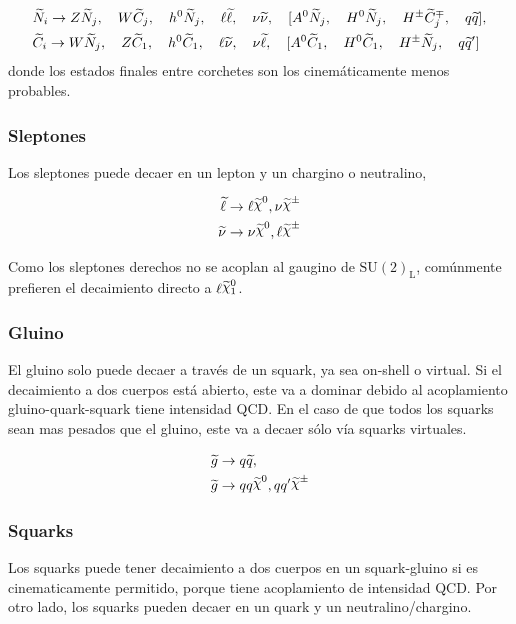 \begin{align*}
  &\widetilde{N}_i \rightarrow Z \widetilde{N}_j, \quad W \widetilde{C}_j, \quad h^0 \widetilde{N}_j, \quad
  \ell \widetilde{\ell}, \quad \nu \widetilde{\nu}, \quad [A^0 \widetilde{N}_j, \quad H^0
    \widetilde{N}_j, \quad H^{\pm} \widetilde{C}_j^{\mp}, \quad q \widetilde{q}],
  \\ &\widetilde{C}_i \rightarrow W \widetilde{N}_j, \quad Z \widetilde{C}_1, \quad h^0 \widetilde{C}_1,
  \quad \ell \widetilde{\nu}, \quad \nu \widetilde{\ell}, \quad [A^0 \widetilde{C}_1, \quad H^0
    \widetilde{C}_1, \quad H^{\pm} \widetilde{N}_j, \quad q \widetilde{q}']
\end{align*}
%
donde los estados finales entre corchetes son los cinemáticamente menos
probables.


\subsubsection{Sleptones}

Los sleptones puede decaer en un lepton y un chargino o neutralino,

\begin{align}
  \slepton &\to \ell \nino, \nu\chinopm \\ \snu &\to \nu\nino, \ell\chinopm
\end{align}

Como los sleptones derechos no se acoplan al gaugino de $\text{SU}(2)_\text{L}$,
comúnmente prefieren el decaimiento directo a $\ell\ninoone$.


\subsubsection{Gluino}

El gluino solo puede decaer a través de un squark, ya sea on-shell o virtual. Si
el decaimiento a dos cuerpos está abierto, este va a dominar debido al
acoplamiento gluino-quark-squark tiene intensidad QCD. En el caso de que todos
los squarks sean mas pesados que el gluino, este va a decaer sólo vía squarks
virtuales.

\begin{align}
  &\gluino \to q\susy{q}, \\
  &\gluino \to qq\nino, qq^\prime \chinopm
\end{align}


\subsubsection{Squarks}

Los squarks puede tener decaimiento a dos cuerpos en un squark-gluino si es
cinematicamente permitido, porque tiene acoplamiento de intensidad QCD. Por otro
lado, los squarks pueden decaer en un quark y un neutralino/chargino.

